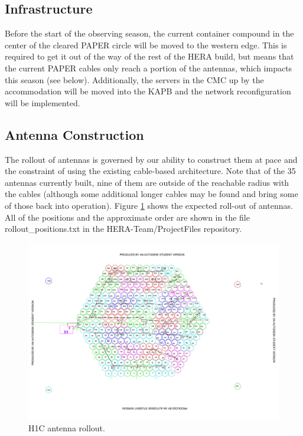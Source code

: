 \documentclass{article}
\begin{document}
\subsection{Infrastructure}
Before the start of the observing season, the current container compound in the center of the cleared PAPER circle will be moved to the western edge.  This is required to get it out of the way of the rest of the HERA build, but means that the current PAPER cables only reach a portion of the antennas, which impacts this season (see below).  Additionally, the servers in the CMC up by the accommodation will be moved into the KAPB and the network reconfiguration will be implemented.

\subsection{Antenna Construction}
The rollout of antennas is governed by our ability to construct them at pace and the constraint of using the existing cable-based architecture.  Note that of the 35 antennas currently built, nine of them are outside of the reachable radius with the cables (although some additional longer cables may be found and bring some of those back into operation).  Figure \ref{Fig:H1Cant} shows the expected roll-out of antennas.  All of the positions and the approximate order are shown in the file rollout\_positions.txt in the HERA-Team/ProjectFiles repository.

\begin{figure}
\includegraphics[width=\textwidth]{heraSite.pdf} %
\caption{H1C antenna rollout.}
\label{Fig:H1Cant}
\end{figure}
\end{document}
